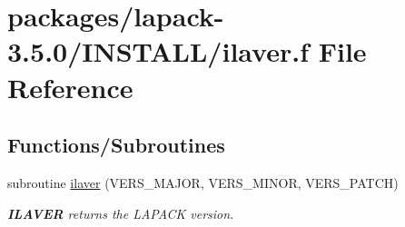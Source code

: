 \hypertarget{INSTALL_2ilaver_8f}{}\section{packages/lapack-\/3.5.0/\+I\+N\+S\+T\+A\+L\+L/ilaver.f File Reference}
\label{INSTALL_2ilaver_8f}
\subsection*{Functions/\+Subroutines}
\begin{DoxyCompactItemize}
\item 
subroutine \hyperlink{group__auxOTHERauxiliary_gace0eea943fa875e927d0b8b6614c9763}{ilaver} (V\+E\+R\+S\+\_\+\+M\+A\+J\+O\+R, V\+E\+R\+S\+\_\+\+M\+I\+N\+O\+R, V\+E\+R\+S\+\_\+\+P\+A\+T\+C\+H)
\begin{DoxyCompactList}\small\item\em {\bfseries I\+L\+A\+V\+E\+R} returns the L\+A\+P\+A\+C\+K version. \end{DoxyCompactList}\end{DoxyCompactItemize}
